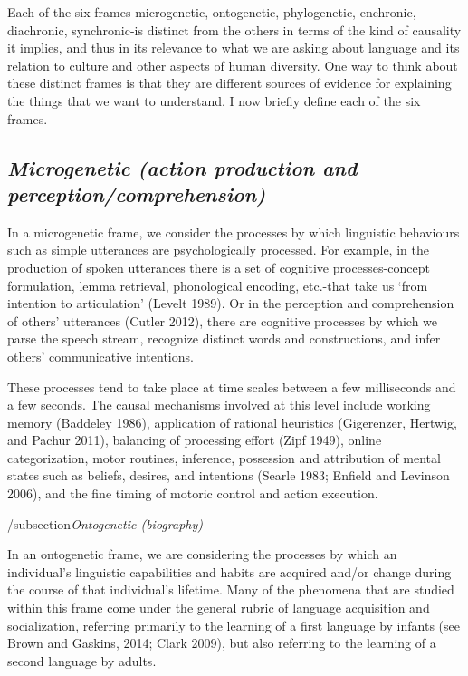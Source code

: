 Each of the six frames-microgenetic, ontogenetic, phylogenetic, 
enchronic, diachronic, synchronic-is distinct from the others in terms 
of the kind of causality it implies, and thus in its relevance to what 
we are asking about language and its relation to culture and other 
aspects of human diversity. One way to think about these distinct frames 
is that they are different sources of evidence for explaining the things 
that we want to understand. I now briefly define each of the six frames.



\subsection{\textit{Microgenetic (action production and perception/comprehension)}}



In a microgenetic frame, we consider the processes by which linguistic 
behaviours such as simple utterances are psychologically processed. For 
example, in the production of spoken utterances there is a set of 
cognitive processes-concept formulation, lemma retrieval, phonological 
encoding, etc.-that take us \textquoteleft from intention to articulation' (Levelt 
1989). Or in the perception and comprehension of others' utterances 
(Cutler 2012), there are cognitive processes by which we parse the 
speech stream, recognize distinct words and constructions, and infer 
others' communicative intentions. 



These processes tend to take place at time scales between a few 
milliseconds and a few seconds. The causal mechanisms involved at this 
level include working memory (Baddeley 1986), application of rational 
heuristics (Gigerenzer, Hertwig, and Pachur 2011), balancing of 
processing effort (Zipf 1949), online categorization, motor routines, 
inference, possession and attribution of mental states such as beliefs, 
desires, and intentions (Searle 1983; Enfield and Levinson 2006), and 
the fine timing of motoric control and action execution.



/subsection{\textit{Ontogenetic (biography)}}



In an ontogenetic frame, we are considering the processes by which an 
individual's linguistic capabilities and habits are acquired and/or 
change during the course of that individual's lifetime. Many of the 
phenomena that are studied within this frame come under the general 
rubric of language acquisition and socialization, referring primarily to 
the learning of a first language by infants (see Brown and Gaskins, 
2014; Clark 2009), but also referring to the learning of a second 
language by adults. 



